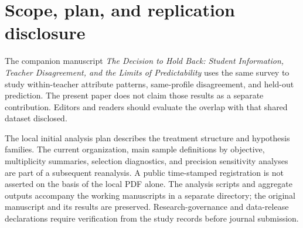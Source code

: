 \section{Scope, plan, and replication disclosure}
\begin{addition}
The companion manuscript \textit{The Decision to Hold Back: Student Information, Teacher Disagreement, and the Limits of Predictability} uses the same survey to study within-teacher attribute patterns, same-profile disagreement, and held-out prediction. The present paper does not claim those results as a separate contribution. Editors and readers should evaluate the overlap with that shared dataset disclosed.

The local initial analysis plan describes the treatment structure and hypothesis families. The current organization, main sample definitions by objective, multiplicity summaries, selection diagnostics, and precision sensitivity analyses are part of a subsequent reanalysis. A public time-stamped registration is not asserted on the basis of the local PDF alone. The analysis scripts and aggregate outputs accompany the working manuscripts in a separate directory; the original manuscript and its results are preserved. Research-governance and data-release declarations require verification from the study records before journal submission.
\end{addition}



